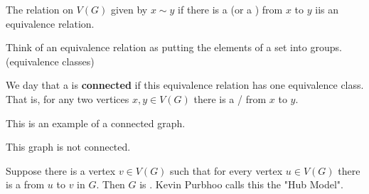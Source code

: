 \documentclass[english, 11pt]{article}
\begin{document}
\begin{thrm}
  The relation on $V(G)$ given by $x \sim y$ if there is a  (or a ) from $x$ to $y$ iis an equivalence relation.
\end{thrm}
\begin{note}
  Think of an equivalence relation as putting the elements of a set into groups. (equivalence classes)
\end{note}

\begin{defn}[connected]\label{connected}
  We day that a  is \textbf{connected} if this equivalence relation has one equivalence class. That is, for any two vertices $x,y \in V(G)$ there is a / from $x$ to $y$.
\end{defn}
\begin{exmp}
  \begin{center}
\end{center}
This is an example of a connected graph.
\end{exmp}
\begin{exmp}
    \begin{center}
\end{center}
This graph is not connected.
\end{exmp}

\begin{thrm}\label{vertextopath}
  Suppose there is a vertex $v \in V(G)$ such that for every vertex $u \in V(G)$ there is a  from $u$ to $v$ in $G$. Then $G$ is . Kevin Purbhoo calls this the "Hub Model".
\end{thrm}
\end{document}
